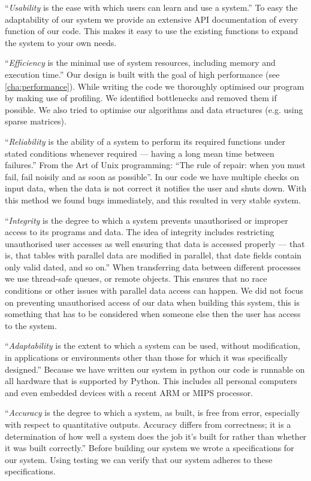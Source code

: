 \documentclass[a4paper, openany, oneside]{memoir}
\begin{document}
``\textit{Usability} is the ease with which users can learn and use a system.'' To easy the adaptability of our system we provide an extensive API documentation of every function of our code. This makes it easy to use the existing functions to expand the system to your own needs.

``\textit{Efficiency} is the minimal use of system resources, including memory and execution time.'' Our design is built with the goal of high performance (see \cref{cha:performance}). While writing the code we thoroughly optimised our program by making use of profiling. We identified bottlenecks and removed them if possible. We also tried to optimise our algorithms and data structures (e.g. using sparse matrices).

``\textit{Reliability} is the ability of a system to perform its required functions under stated conditions whenever required --- having a long mean time between failures.'' From the Art of Unix programming\cite{raymond2003art}: ``The rule of repair: when you must fail, fail noisily and as soon as possible''. In our code we have multiple checks on input data, when the data is not correct it notifies the user and shuts down. With this method we found bugs immediately, and this resulted in very stable system.

``\textit{Integrity} is the degree to which a system prevents unauthorised or improper access to its programs and data. The idea of integrity includes restricting unauthorised user accesses as well ensuring that data is accessed properly --- that is, that tables with parallel data are modified in parallel, that date fields contain only valid dated, and so on.'' When transferring data between different processes we use thread-safe queues, or remote objects. This ensures that no race conditions or other issues with parallel data access can happen. We did not focus on preventing unauthorised access of our data when building this system, this is something that has to be considered when someone else then the user has access to the system.

``\textit{Adaptability} is the extent to which a system can be used, without modification, in applications or environments other than those for which it was specifically designed.'' Because we have written our system in python our code is runnable on all hardware that is supported by Python. This includes all personal computers and even embedded devices with a recent ARM or MIPS processor.

``\textit{Accuracy} is the degree to which a system, as built, is free from error, especially with respect to quantitative outputs. Accuracy differs from correctness; it is a determination of how well a system does the job it's built for rather than whether it was built correctly.'' Before building our system we wrote a specifications for our system. Using testing we can verify that our system adheres to these specifications.
\end{document}
